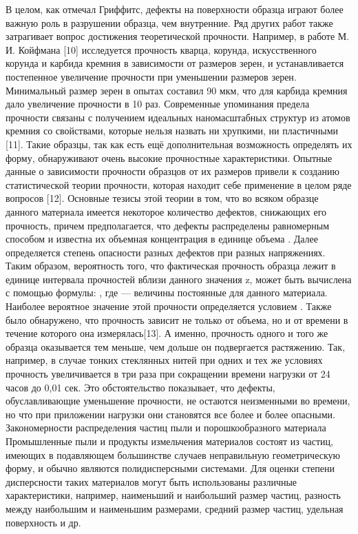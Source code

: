 В целом, как отмечал Гриффитс, дефекты на поверхности образца играют более важную роль в разрушении образца, чем внутренние.
Ряд других работ также затрагивает вопрос достижения теоретической прочности. Например, в работе М. И. Койфмана [10] исследуется прочность кварца, корунда, искусственного корунда и карбида кремния в зависимости от размеров зерен, и устанавливается постепенное увеличение прочности при уменьшении размеров зерен. Минимальный размер зерен в опытах составил 90 мкм, что для карбида кремния дало увеличение прочности в 10 раз.
Современные упоминания предела прочности связаны с получением идеальных наномасштабных структур из атомов кремния со свойствами, которые нельзя назвать ни хрупкими, ни пластичными [11]. Такие образцы, так как есть ещё дополнительная возможность определять их форму, обнаруживают очень высокие прочностные характеристики.
Опытные данные о зависимости прочности образцов от их размеров привели к созданию статистической теории прочности, которая находит себе применение в целом ряде вопросов [12].
Основные тезисы этой теории в том, что во всяком образце данного материала имеется некоторое количество дефектов, снижающих его прочность, причем предполагается, что дефекты распределены равномерным способом и известна их объемная концентрация   в единице объема  . Далее определяется степень опасности разных дефектов при разных напряжениях. 
Таким образом, вероятность того, что фактическая прочность образца лежит в единице интервала прочностей вблизи данного значения z, может быть вычислена с помощью формулы:
 ,
где  — величины постоянные для данного материала.
Наиболее вероятное значение этой прочности определяется условием
 .
Также было обнаружено, что прочность зависит не только от объема, но и от времени в течение которого она измерялась[13]. А именно, прочность одного и того же образца оказывается тем меньше, чем дольше он подвергается растяжению. Так, например, в случае тонких стеклянных нитей при одних и тех же условиях прочность увеличивается в три раза при сокращении времени нагрузки от 24 часов до 0,01 сек. Это обстоятельство показывает, что дефекты, обуславливающие уменьшение прочности, не остаются неизменными во времени, но что при приложении нагрузки они становятся все более и более опасными.
Закономерности распределения частиц пыли и порошкообразного материала
Промышленные пыли и продукты измельчения материалов состоят из частиц, имеющих в подавляющем большинстве случаев неправильную геометрическую форму, и обычно являются полидисперсными системами.
Для оценки степени дисперсности таких материалов могут быть использованы различные характеристики, например, наименьший и наибольший размер частиц, разность между наибольшим и наименьшим размерами, средний размер частиц, удельная поверхность и др.
